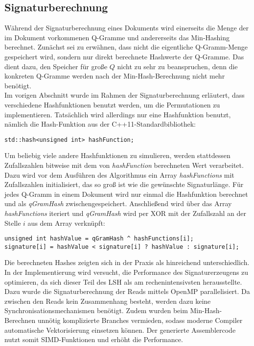 \subsection{Signaturberechnung}
Während der Signaturberechnung eines Dokuments wird einerseits die Menge der im Dokument vorkommenen Q-Gramme und andererseits das Min-Hashing berechnet.
Zunächst sei zu erwähnen, dass nicht die eigentliche Q-Gramm-Menge gespeichert wird, sondern nur direkt berechnete Hashwerte der Q-Gramme.
Das dient dazu, den Speicher für große $Q$ nicht zu sehr zu beanspruchen, denn die konkreten Q-Gramme werden nach der Min-Hash-Berechnung nicht mehr benötigt. \\
Im vorigen Abschnitt wurde im Rahmen der Signaturberechnung erläutert, dass verschiedene Hashfunktionen benutzt werden, um die Permutationen zu implementieren.
Tatsächlich wird allerdings nur eine Hashfunktion benutzt, nämlich die Hash-Funktion aus der C++11-Standardbibliothek:
\begin{lstlisting}
std::hash<unsigned int> hashFunction;
\end{lstlisting}
Um beliebig viele andere Hashfunktionen zu simulieren, werden stattdessen Zufallszahlen bitweise mit dem von \textit{hashFunction} berechneten Wert verarbeitet.
Dazu wird vor dem Ausführen des Algorithmus ein Array \textit{hashFunctions} mit Zufallszahlen initialisiert, das so groß ist wie die gewünschte Signaturlänge.
Für jedes Q-Gramm in einem Dokument wird nur einmal die Hashfunktion berechnet und als \textit{qGramHash} zwischengespeichert.
Anschließend wird über das Array \textit{hashFunctions} iteriert und \textit{qGramHash} wird per XOR mit der Zufallszahl an der Stelle $i$ aus dem Array verknüpft:
\begin{lstlisting}
unsigned int hashValue = qGramHash ^ hashFunctions[i];	
signature[i] = hashValue < signature[i] ? hashValue : signature[i];
\end{lstlisting}
Die berechneten Hashes zeigten sich in der Praxis als hinreichend unterschiedlich. \\
In der Implementierung wird versucht, die Performance des Signaturerzeugens zu optimieren, da sich dieser Teil des LSH als am rechenintensivsten herausstellte.
Dazu wurde die Signaturberechnung der Reads mittels OpenMP parallelisiert.
Da zwischen den Reads kein Zusammenhang besteht, werden dazu keine Synchronisationsmechanismen benötigt.
Zudem wurden beim Min-Hash-Berechnen unnötig komplizierte Branches vermieden, sodass moderne Compiler automatische Vektorisierung einsetzen können.
Der generierte Assemblercode nutzt somit SIMD-Funktionen und erhöht die Performance.

